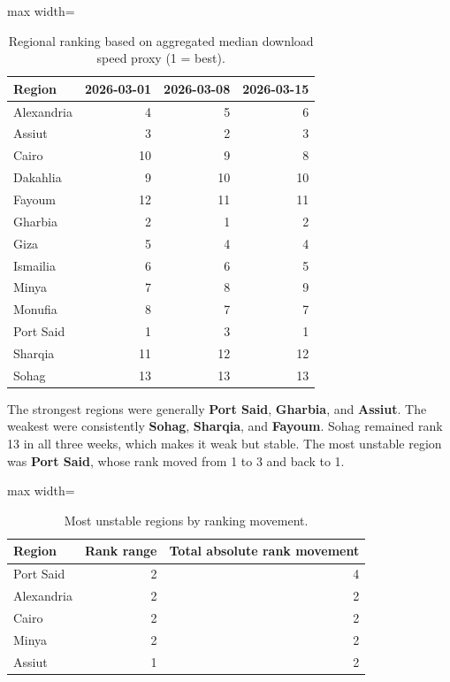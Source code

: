 \documentclass[12pt,a4paper]{article}
\begin{document}
\begin{table}[htbp]
\centering
\small
\begin{adjustbox}{max width=\textwidth}
\begin{tabular}{lrrr}
\toprule
Region & 2026-03-01 & 2026-03-08 & 2026-03-15 \\
\midrule
Alexandria & 4 & 5 & 6 \\
Assiut & 3 & 2 & 3 \\
Cairo & 10 & 9 & 8 \\
Dakahlia & 9 & 10 & 10 \\
Fayoum & 12 & 11 & 11 \\
Gharbia & 2 & 1 & 2 \\
Giza & 5 & 4 & 4 \\
Ismailia & 6 & 6 & 5 \\
Minya & 7 & 8 & 9 \\
Monufia & 8 & 7 & 7 \\
Port Said & 1 & 3 & 1 \\
Sharqia & 11 & 12 & 12 \\
Sohag & 13 & 13 & 13 \\
\bottomrule
\end{tabular}
\end{adjustbox}
\caption{Regional ranking based on aggregated median download speed proxy (1 = best).}
\label{tab:rank}
\end{table}

The strongest regions were generally \textbf{Port Said}, \textbf{Gharbia}, and \textbf{Assiut}. The weakest were consistently \textbf{Sohag}, \textbf{Sharqia}, and \textbf{Fayoum}. Sohag remained rank 13 in all three weeks, which makes it weak but stable. The most unstable region was \textbf{Port Said}, whose rank moved from 1 to 3 and back to 1.

\begin{table}[htbp]
\centering
\begin{adjustbox}{max width=\textwidth}
\begin{tabular}{lrr}
\toprule
Region & Rank range & Total absolute rank movement \\
\midrule
Port Said & 2 & 4 \\
Alexandria & 2 & 2 \\
Cairo & 2 & 2 \\
Minya & 2 & 2 \\
Assiut & 1 & 2 \\
\bottomrule
\end{tabular}
\end{adjustbox}
\caption{Most unstable regions by ranking movement.}
\label{tab:unstable}
\end{table}
\end{document}
